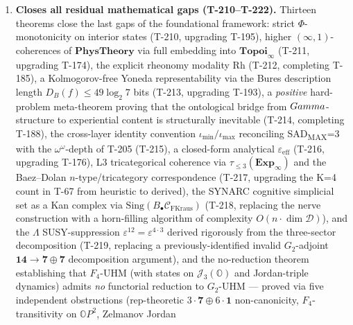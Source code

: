 \begin{enumerate}[leftmargin=2em]
        T-192~ verifies that the experiential 2-category
        $\mathbf{Exp}^{(2)}$ satisfies all five Mac\,Lane axioms (vertical and
        horizontal composition, interchange, identities), ensuring the phenomenal
        functor $F$ has a well-defined compositional codomain.
  \item \textbf{Closes all residual mathematical gaps
        (T-210--T-222).} Thirteen theorems close the last gaps of the
        foundational framework: strict $\Phi$-monotonicity on interior
        states (T-210, upgrading T-195), higher $(\infty,1)$-coherences
        of $\mathbf{PhysTheory}$ via full embedding into
        $\mathbf{Topoi}_\infty$ (T-211, upgrading T-174), the explicit
        rheonomy modality $\mathrm{Rh}$ (T-212, completing T-185), a
        Kolmogorov-free Yoneda representability via the Bures
        description length $D_B(f) \leq 49 \log_2 7$ bits (T-213,
        upgrading T-193), a \emph{positive} hard-problem meta-theorem
        proving that the ontological bridge from $Gamma$-structure to
        experiential content is structurally inevitable (T-214,
        completing T-188), the cross-layer identity convention
        $\iota_{\min}/\iota_{\max}$ reconciling
        SAD\textsubscript{MAX}=3 with the $\omega^\omega$-depth of
        T-205 (T-215), a closed-form analytical
        $\varepsilon_{\mathrm{eff}}$ (T-216, upgrading T-176), L3
        tricategorical coherence via $\tau_{\leq 3}(\mathbf{Exp}_\infty)$
        and the Baez--Dolan $n$-type/tricategory correspondence (T-217,
        upgrading the K=4 count in T-67 from heuristic to derived), the
        SYNARC cognitive simplicial set as a Kan complex via
        $\mathrm{Sing}(B_\bullet \mathcal C_{\mathrm{FKraus}})$
        (T-218, replacing the nerve construction with a horn-filling
        algorithm of complexity $O(n \cdot \dim \mathcal D)$), and the
        $\Lambda$ SUSY-suppression $\varepsilon^{12} = \varepsilon^{4
        \cdot 3}$ derived rigorously from the three-sector
        decomposition (T-219, replacing a previously-identified invalid
        $G_2$-adjoint $\mathbf{14} \to \mathbf{7} \oplus \mathbf{7}$
        decomposition argument), and the no-reduction theorem
        establishing that $F_4$-UHM (with states on
        $\mathcal J_3(\mathbb O)$ and Jordan-triple dynamics) admits
        \emph{no} functorial reduction to $G_2$-UHM --- proved via
        five independent obstructions (rep-theoretic
        $3\cdot\mathbf 7 \oplus 6\cdot\mathbf 1$ non-canonicity,
        $F_4$-transitivity on $\mathbb O P^2$, Zelmanov Jordan

\end{enumerate}
